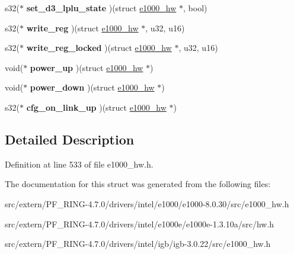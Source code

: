 \begin{DoxyCompactItemize}
\item 
\hypertarget{structe1000__phy__operations_a72438536eb19aea1953b3648d21c617a}{
s32($\ast$ {\bfseries set\_\-d3\_\-lplu\_\-state} )(struct \hyperlink{structe1000__hw}{e1000\_\-hw} $\ast$, bool)}
\label{structe1000__phy__operations_a72438536eb19aea1953b3648d21c617a}

\item 
\hypertarget{structe1000__phy__operations_a4814f5bbf2f786cd9107b2e90d376fa9}{
s32($\ast$ {\bfseries write\_\-reg} )(struct \hyperlink{structe1000__hw}{e1000\_\-hw} $\ast$, u32, u16)}
\label{structe1000__phy__operations_a4814f5bbf2f786cd9107b2e90d376fa9}

\item 
\hypertarget{structe1000__phy__operations_a366dab1a2474da6932a84d32531f4f0f}{
s32($\ast$ {\bfseries write\_\-reg\_\-locked} )(struct \hyperlink{structe1000__hw}{e1000\_\-hw} $\ast$, u32, u16)}
\label{structe1000__phy__operations_a366dab1a2474da6932a84d32531f4f0f}

\item 
\hypertarget{structe1000__phy__operations_abca3b264c7fe986f4208776fcfb00873}{
void($\ast$ {\bfseries power\_\-up} )(struct \hyperlink{structe1000__hw}{e1000\_\-hw} $\ast$)}
\label{structe1000__phy__operations_abca3b264c7fe986f4208776fcfb00873}

\item 
\hypertarget{structe1000__phy__operations_ab44abd070d5fcb963d39089df7a54e56}{
void($\ast$ {\bfseries power\_\-down} )(struct \hyperlink{structe1000__hw}{e1000\_\-hw} $\ast$)}
\label{structe1000__phy__operations_ab44abd070d5fcb963d39089df7a54e56}

\item 
\hypertarget{structe1000__phy__operations_afbb759f8ffbb20edfe2d5eec7f249405}{
s32($\ast$ {\bfseries cfg\_\-on\_\-link\_\-up} )(struct \hyperlink{structe1000__hw}{e1000\_\-hw} $\ast$)}
\label{structe1000__phy__operations_afbb759f8ffbb20edfe2d5eec7f249405}

\end{DoxyCompactItemize}


\subsection{Detailed Description}


Definition at line 533 of file e1000\_\-hw.h.



The documentation for this struct was generated from the following files:\begin{DoxyCompactItemize}
\item 
src/extern/PF\_\-RING-\/4.7.0/drivers/intel/e1000/e1000-\/8.0.30/src/e1000\_\-hw.h\item 
src/extern/PF\_\-RING-\/4.7.0/drivers/intel/e1000e/e1000e-\/1.3.10a/src/hw.h\item 
src/extern/PF\_\-RING-\/4.7.0/drivers/intel/igb/igb-\/3.0.22/src/e1000\_\-hw.h\end{DoxyCompactItemize}

